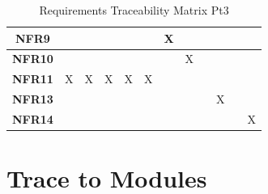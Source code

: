 \documentclass[12pt, titlepage]{article}
\begin{document}
\begin{table}[H]
\begin{tabular}{|c|c|c|c|c|c|c|c|c|c|c|c|}
    \textbf{NFR9}  &                       &                       &                       &                       &                     & X                   &                     &                     &                     &                     &                         \\ \hline
    \textbf{NFR10} &                       &                       &                       &                       &                     &                     & X                   &                     &                     &                     &                         \\ \hline
    \textbf{NFR11} & X                     & X                     & X                     & X                     & X                   &                     &                     &                     &                     &                     &                         \\ \hline
    \textbf{NFR13} &                       &                       &                       &                       &                     &                     &                     &                     & X                   &                     &                         \\ \hline
    \textbf{NFR14} &                       &                       &                       &                       &                     &                     &                     &                     &                     &                     & X                       \\ \hline
  \end{tabular}
  \caption{Requirements Traceability Matrix Pt3}
  \label{Table:C_Req_trace}
\end{table}
\newpage

\section{Trace to Modules}
\end{document}
